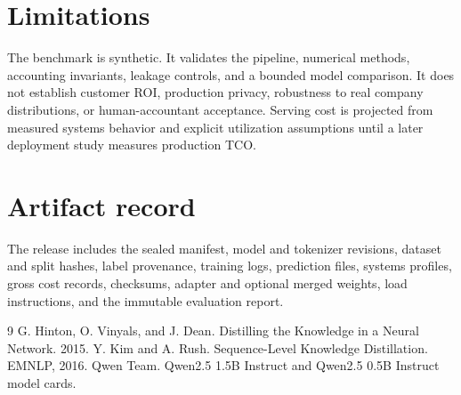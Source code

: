 \documentclass{article}
\begin{document}
\section{Limitations}
The benchmark is synthetic. It validates the pipeline, numerical methods, accounting invariants, leakage controls, and a bounded model comparison. It does not establish customer ROI, production privacy, robustness to real company distributions, or human-accountant acceptance. Serving cost is projected from measured systems behavior and explicit utilization assumptions until a later deployment study measures production TCO.

\section{Artifact record}
The release includes the sealed manifest, model and tokenizer revisions, dataset and split hashes, label provenance, training logs, prediction files, systems profiles, gross cost records, checksums, adapter and optional merged weights, load instructions, and the immutable evaluation report.

\begin{thebibliography}{9}
 G. Hinton, O. Vinyals, and J. Dean. Distilling the Knowledge in a Neural Network. 2015.
 Y. Kim and A. Rush. Sequence-Level Knowledge Distillation. EMNLP, 2016.
 Qwen Team. Qwen2.5 1.5B Instruct and Qwen2.5 0.5B Instruct model cards.
\end{thebibliography}
\end{document}
